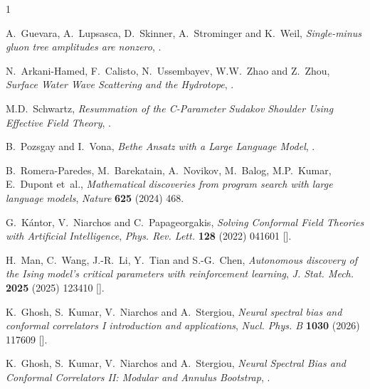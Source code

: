 \clearpage
\providecommand{\href}[2]{#2}\begingroup\raggedright\begin{thebibliography}{1}

A.~Guevara, A.~Lupsasca, D.~Skinner, A.~Strominger and K.~Weil,
  \emph{{Single-minus gluon tree amplitudes are nonzero}},
  \href{https://arxiv.org/abs/2602.12176}{{}}.

N.~Arkani-Hamed, F.~Calisto, N.~Ussembayev, W.W.~Zhao and Z.~Zhou,
  \emph{{Surface Water Wave Scattering and the Hydrotope}},
  \href{https://arxiv.org/abs/2606.28280}{{}}.

M.D.~Schwartz, \emph{{Resummation of the C-Parameter Sudakov Shoulder Using
  Effective Field Theory}},  \href{https://arxiv.org/abs/2601.02484}{{}}.

B.~Pozsgay and I.~Vona, \emph{{Bethe Ansatz with a Large Language Model}},
  \href{https://arxiv.org/abs/2603.29932}{{}}.

B.~Romera-Paredes, M.~Barekatain, A.~Novikov, M.~Balog, M.P.~Kumar, E.~Dupont
  et~al., \emph{{Mathematical discoveries from program search with large
  language models}},
  \href{https://doi.org/10.1038/s41586-023-06924-6}{\emph{Nature} {\bfseries
  625} (2024) 468}.

G.~K{\'a}ntor, V.~Niarchos and C.~Papageorgakis, \emph{{Solving Conformal Field
  Theories with Artificial Intelligence}},
  \href{https://doi.org/10.1103/PhysRevLett.128.041601}{\emph{Phys. Rev. Lett.}
  {\bfseries 128} (2022) 041601}
  [\href{https://arxiv.org/abs/2108.08859}{{}}].

H.~Man, C.~Wang, J.-R.~Li, Y.~Tian and S.-G.~Chen, \emph{{Autonomous discovery
  of the Ising model's critical parameters with reinforcement learning}},
  \href{https://doi.org/10.1088/1742-5468/ae22ea}{\emph{J. Stat. Mech.}
  {\bfseries 2025} (2025) 123410}
  [\href{https://arxiv.org/abs/2601.05577}{{}}].

K.~Ghosh, S.~Kumar, V.~Niarchos and A.~Stergiou, \emph{{Neural spectral bias
  and conformal correlators I introduction and applications}},
  \href{https://doi.org/10.1016/j.nuclphysb.2026.117609}{\emph{Nucl. Phys. B}
  {\bfseries 1030} (2026) 117609}
  [\href{https://arxiv.org/abs/2604.18686}{{}}].

K.~Ghosh, S.~Kumar, V.~Niarchos and A.~Stergiou, \emph{{Neural Spectral Bias
  and Conformal Correlators II: Modular and Annulus Bootstrap}},
  \href{https://arxiv.org/abs/2607.24913}{{}}.

\end{thebibliography}\endgroup
